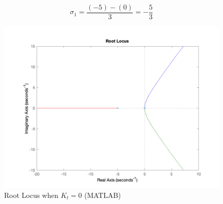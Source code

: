 \documentclass[12pt, letterpaper]{../assignment}
\begin{document}
$$ \sigma_1 = \frac{(-5) - (0) }{3} = -\frac{5}{3} $$


\begin{figure}[H]
    \centering
    \includegraphics[width=0.7\linewidth]{./figures/Q2a_MATLAB_rootLocus.png}
    \caption{Root Locus when $K_t = 0$ (MATLAB)}
    \label{fig:step}
\end{figure}




\end{document}
